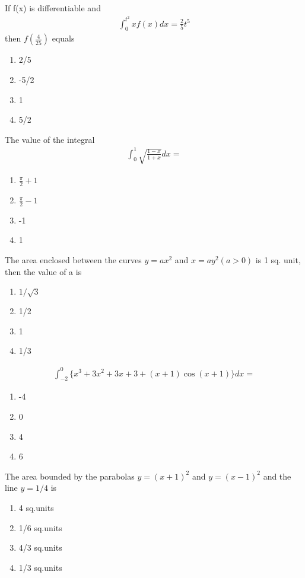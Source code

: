 \item If f(x) is differentiable and 
\begin{align*}
\int_{0}^{t^{2}}xf(x)dx = \frac{2}{5}t^{5}
\end{align*}
then $f(\frac{4}{25})$ equals
\begin{enumerate}
\item 2/5
\item -5/2
\item 1
\item 5/2
\end{enumerate}

\item The value of the integral
\begin{align*}
\int_{0}^{1}\sqrt{\frac{1 - x}{1 + x}}dx = 
\end{align*}
\begin{enumerate}
\item $\frac{\pi}{2} + 1$
\item $\frac{\pi}{2} - 1$
\item -1
\item 1
\end{enumerate}

\item The area enclosed between the curves $y = ax^{2}$  and $x = ay^{2}(a > 0)$ is 1 sq. unit, then the value of a is
\begin{enumerate}
\item $1/\sqrt{3}$
\item 1/2
\item 1
\item 1/3
\end{enumerate}

\item 
\begin{align*}
\int_{-2}^{0}\{x^3+3x^2+3x+3+(x+1)\cos(x+1)\}dx = 
\end{align*}
\begin{enumerate}
\item -4
\item 0
\item 4
\item 6
\end{enumerate}

\item The area bounded by the parabolas $y = (x + 1)^{2}$ and $y = (x - 1)^{2}$ and the line $y = 1/4$ is
\begin{enumerate}
\item 4 sq.units
\item 1/6 sq.units
\item 4/3 sq.units
\item 1/3 sq.units
\end{enumerate}

